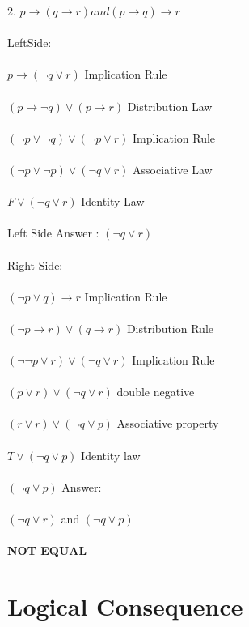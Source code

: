 \documentclass[11pt]{article}
\begin{document}
2. $p \rightarrow (q \rightarrow r) and (p \rightarrow q) \rightarrow r $\\\\
LeftSide: \\\\
$ p \rightarrow ( \neg q \lor r ) $ 
Implication Rule \\\\
$ (p \rightarrow \neg q) \lor ( p \rightarrow r ) $ 
Distribution Law \\\\
$ (\neg p \lor \neg q) \lor ( \neg p \lor r ) $ 
Implication Rule \\\\
$ (\neg p \lor \neg p ) \lor ( \neg q \lor r ) $ 
Associative Law \\\\ 
$ F \lor ( \neg q \lor r ) $ 
Identity Law \\\\ 
Left Side Answer :
$(\neg q \lor r ) $ \\\\
Right Side: \\\\
$ (\neg p \lor q ) \rightarrow r $ 
Implication Rule \\\\
$ (\neg p \rightarrow r) \lor ( q \rightarrow r ) $ 
Distribution Rule \\\\
$ (\neg \neg p \lor r ) \lor ( \neg q \lor r ) $ 
Implication Rule \\\\
$ ( p \lor r) \lor ( \neg q \lor r ) $ 
double negative \\\\ 
$ (r \lor r) \lor ( \neg q \lor p) $ 
Associative property \\\\
$ T \lor (\neg q \lor p) $ 
Identity law \\\\
$ (\neg q \lor p) $ 
Answer: \\\\
$(\neg q \lor r ) $ and $ (\neg q \lor p) $ \\\\
\textbf { NOT EQUAL } 



\section{Logical Consequence}
\end{document}
